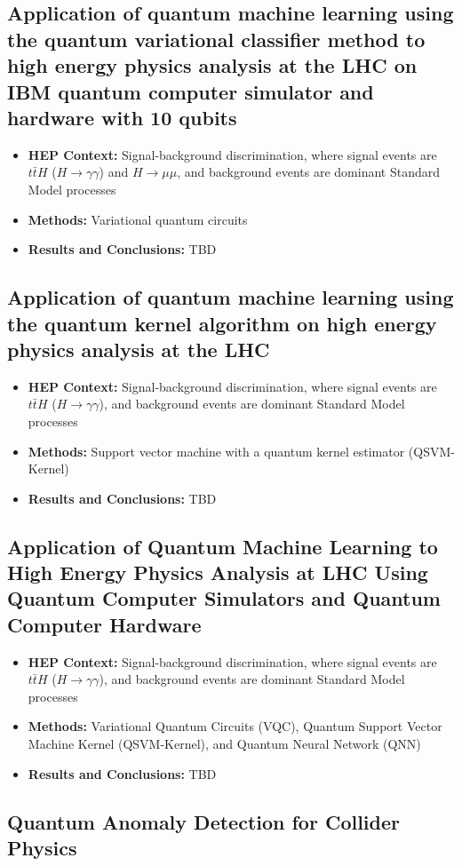 \subsection{Application of quantum machine learning using the quantum variational classifier method to high energy physics analysis at the LHC on IBM quantum computer simulator and hardware with 10 qubits~\cite{Wu:2020cye}}
\begin{itemize}
	\item \textbf{HEP Context: }Signal-background discrimination, where signal events are $t\bar{t}H$ ($H\rightarrow\gamma\gamma$) and $H\rightarrow\mu\mu$, and background events are dominant Standard Model processes
	\item \textbf{Methods: }Variational quantum circuits
	\item \textbf{Results and Conclusions: }TBD
\end{itemize}\subsection{Application of quantum machine learning using the quantum kernel algorithm on high energy physics analysis at the LHC~\cite{Wu:2021xsj}}
\begin{itemize}
	\item \textbf{HEP Context: }Signal-background discrimination, where signal events are $t\bar{t}H$ ($H\rightarrow\gamma\gamma$), and background events are dominant Standard Model processes
	\item \textbf{Methods: }Support vector machine with a quantum kernel estimator (QSVM-Kernel)
	\item \textbf{Results and Conclusions: }TBD
\end{itemize}\subsection{Application of Quantum Machine Learning to High Energy Physics Analysis at LHC Using Quantum Computer Simulators and Quantum Computer Hardware~\cite{Wu:2022tnc}}
\begin{itemize}
	\item \textbf{HEP Context: }Signal-background discrimination, where signal events are $t\bar{t}H$ ($H\rightarrow\gamma\gamma$), and background events are dominant Standard Model processes
	\item \textbf{Methods: }Variational Quantum Circuits (VQC), Quantum Support Vector Machine Kernel (QSVM-Kernel), and Quantum Neural Network (QNN)
	\item \textbf{Results and Conclusions: }TBD
\end{itemize}\subsection{Quantum Anomaly Detection for Collider Physics~\cite{Alvi:2022fkk}}
